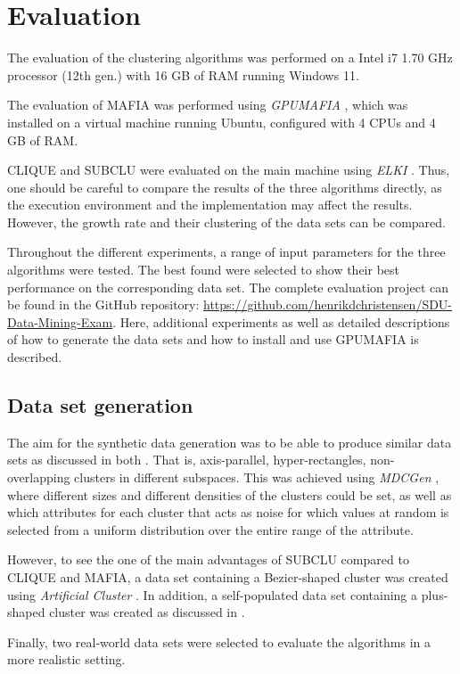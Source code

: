 \section{Evaluation}
The evaluation of the clustering algorithms was performed on a Intel i7 1.70 GHz processor (12th gen.) with 16 GB of RAM running Windows 11.

The evaluation of MAFIA was performed using \textit{GPUMAFIA} \cite{gpumafia}, which was installed on a virtual machine running Ubuntu, configured with 4 CPUs and 4 GB of RAM.

CLIQUE and SUBCLU were evaluated on the main machine using \textit{ELKI} \cite{elki}. Thus, one should be careful to compare the results of the three algorithms directly, as the execution environment and the implementation may affect the results. However, the growth rate and their clustering of the data sets can be compared.

Throughout the different experiments, a range of input parameters for the three algorithms were tested. The best found were selected to show their best performance on the corresponding data set. The complete evaluation project can be found in the GitHub repository: \url{https://github.com/henrikdchristensen/SDU-Data-Mining-Exam}. Here, additional experiments as well as detailed descriptions of how to generate the data sets and how to install and use GPUMAFIA is described.

\subsection{Data set generation}
The aim for the synthetic data generation was to be able to produce similar data sets as discussed in both \cite{clique,mafia}. That is, axis-parallel, hyper-rectangles, non-overlapping clusters in different subspaces. This was achieved using \textit{MDCGen} \cite{mdcgen}, where different sizes and different densities of the clusters could be set, as well as which attributes for each cluster that acts as noise for which values at random is selected from a uniform distribution over the entire range of the attribute.

However, to see the one of the main advantages of SUBCLU compared to CLIQUE and MAFIA, a data set containing a Bezier-shaped cluster was created using \textit{Artificial Cluster} \cite{ac}. In addition, a self-populated data set containing a plus-shaped cluster was created as discussed in \cite{mafia}.

Finally, two real-world data sets were selected to evaluate the algorithms in a more realistic setting.

